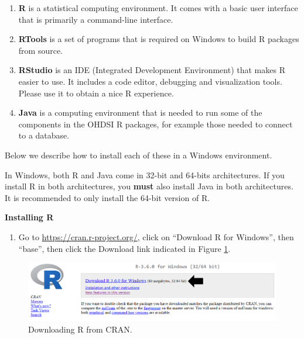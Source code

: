 \documentclass[11pt]{book}
\providecommand{\tightlist}{%
  \setlength{\itemsep}{0pt}\setlength{\parskip}{0pt}}
\theoremstyle{definition}
\theoremstyle{definition}
\theoremstyle{definition}
\theoremstyle{remark}
\let\BeginKnitrBlock\begin \let\EndKnitrBlock\end
\begin{document}
\begin{enumerate}
\def\labelenumi{\arabic{enumi}.}
\tightlist
\item
  \textbf{R} is a statistical computing environment. It comes with a basic user interface that is primarily a command-line interface.
\item
  \textbf{RTools} is a set of programs that is required on Windows to build R packages from source.
\item
  \textbf{RStudio} is an IDE (Integrated Development Environment) that makes R easier to use. It includes a code editor, debugging and visualization tools. Please use it to obtain a nice R experience.
\item
  \textbf{Java} is a computing environment that is needed to run some of the components in the OHDSI R packages, for example those needed to connect to a database.
\end{enumerate}

Below we describe how to install each of these in a Windows environment.

\BeginKnitrBlock{rmdimportant}
In Windows, both R and Java come in 32-bit and 64-bits architectures. If you install R in both architectures, you \textbf{must} also install Java in both architectures. It is recommended to only install the 64-bit version of R.
\EndKnitrBlock{rmdimportant}

\textbf{Installing R}

\begin{enumerate}
\def\labelenumi{\arabic{enumi}.}
\tightlist
\item
  Go to \url{https://cran.r-project.org/}, click on ``Download R for Windows'', then ``base'', then click the Download link indicated in Figure \ref{fig:downloadR}.
\end{enumerate}

\begin{figure}

{\centering \includegraphics[width=1\linewidth]{images/OhdsiAnalyticsTools/downloadR} 

}

\caption{Downloading R from CRAN.}\label{fig:downloadR}
\end{figure}
\end{document}
